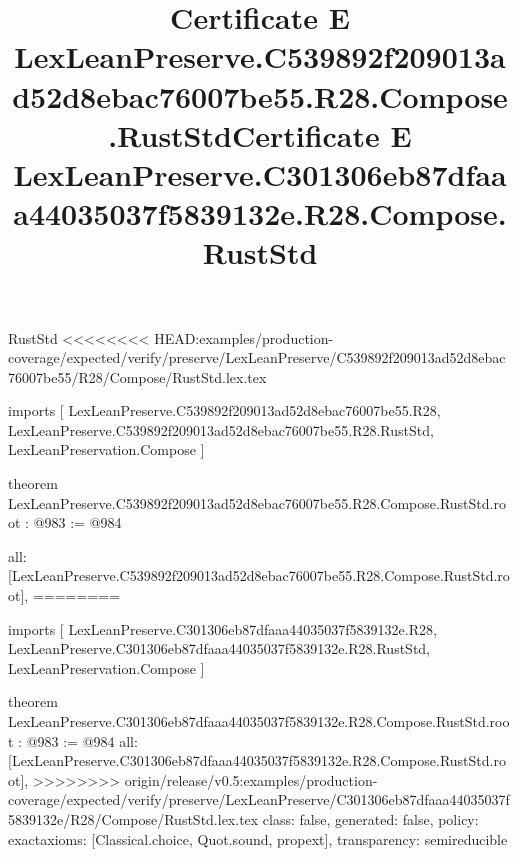 \begin{lexlean}{RustStd}
<<<<<<<< HEAD:examples/production-coverage/expected/verify/preserve/LexLeanPreserve/C539892f209013ad52d8ebac76007be55/R28/Compose/RustStd.lex.tex
\title{Certificate E LexLeanPreserve.C539892f209013ad52d8ebac76007be55.R28.Compose.RustStd}
\begin{coremodule}
imports [
  LexLeanPreserve.C539892f209013ad52d8ebac76007be55.R28,
  LexLeanPreserve.C539892f209013ad52d8ebac76007be55.R28.RustStd,
  LexLeanPreservation.Compose
]

theorem LexLeanPreserve.C539892f209013ad52d8ebac76007be55.R28.Compose.RustStd.root : @983 := @984 {
  all: [LexLeanPreserve.C539892f209013ad52d8ebac76007be55.R28.Compose.RustStd.root],
========
\title{Certificate E LexLeanPreserve.C301306eb87dfaaa44035037f5839132e.R28.Compose.RustStd}
\begin{coremodule}
imports [
  LexLeanPreserve.C301306eb87dfaaa44035037f5839132e.R28,
  LexLeanPreserve.C301306eb87dfaaa44035037f5839132e.R28.RustStd,
  LexLeanPreservation.Compose
]

theorem LexLeanPreserve.C301306eb87dfaaa44035037f5839132e.R28.Compose.RustStd.root : @983 := @984 {
  all: [LexLeanPreserve.C301306eb87dfaaa44035037f5839132e.R28.Compose.RustStd.root],
>>>>>>>> origin/release/v0.5:examples/production-coverage/expected/verify/preserve/LexLeanPreserve/C301306eb87dfaaa44035037f5839132e/R28/Compose/RustStd.lex.tex
  class: false,
  generated: false,
  policy: exact{axioms: [Classical.choice, Quot.sound, propext]},
  transparency: semireducible
}


\end{coremodule}}
\end{coremodule}
\end{lexlean}
